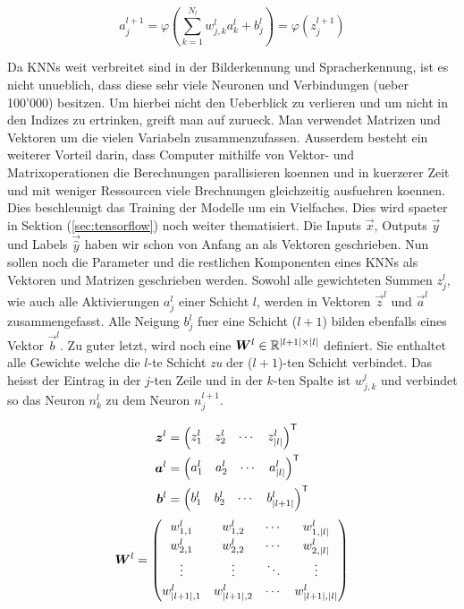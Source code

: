 \begin{equation}\label{eq:aktivierung_normal}
  a_j^{l+1} = \varphi\left(\sum_{k=1}^{N_l} w_{j,k}^l a_k^{l} + b_j^l \right) = \varphi \left( z_j^{l+1} \right)
\end{equation}
\par\bigskip
Da KNNs weit verbreitet sind in der Bilderkennung und Spracherkennung, ist es
nicht unueblich, dass diese sehr viele Neuronen und Verbindungen (ueber 100'000) besitzen.
Um hierbei nicht den Ueberblick zu verlieren und um nicht in den Indizes zu
ertrinken, greift man auf  zurueck. Man verwendet
Matrizen und Vektoren um die vielen Variabeln zusammenzufassen.
Ausserdem besteht ein weiterer Vorteil darin, dass Computer mithilfe von Vektor-
und Matrixoperationen die Berechnungen parallisieren koennen und in kuerzerer
Zeit und mit weniger Ressourcen viele Brechnungen gleichzeitig ausfuehren koennen.
Dies beschleunigt das Training der Modelle um
ein Vielfaches. Dies wird spaeter in Sektion
(\ref{sec:tensorflow}) noch weiter thematisiert.
\para{}
Die Inputs $\vec{x}$, Outputs $\vec{y}$ und Labels $\vec{\hat{y}}$ haben wir schon von Anfang an als Vektoren geschrieben.
Nun sollen noch die Parameter und die restlichen Komponenten eines KNNs als Vektoren und Matrizen geschrieben werden.
Sowohl alle gewichteten Summen $z_j^l$, wie auch alle Aktivierungen $a_j^l$
einer Schicht $l$, werden in Vektoren $\vec{z}^l$ und $\vec{a}^l$ zusammengefasst.
Alle Neigung $b_j^l$ fuer eine Schicht ($l+1$) bilden ebenfalls eines Vektor $\vec{b}^l$.
Zu guter letzt, wird noch eine  $\bm{W}^l \in
\mathbb{R}^{|l+1| \times |l|}$
definiert. Sie enthaltet alle Gewichte welche die $l$-te
Schicht \textit{zu} der ($l+1$)-ten Schicht verbindet.
Das heisst der Eintrag in der $j$-ten Zeile und in
der $k$-ten Spalte ist $w_{j,k}^l$ und verbindet so das Neuron $n_k^{l}$ zu
dem Neuron $n_j^{l+1}$.
\para{}

\begin{align*}
  \bm{z}^l &=  \begin{pmatrix} z_1^l & z_2^l & \cdots & z_{|l|}^l \end{pmatrix}^{\mathsf{T}} \\
  \bm{a}^l &=  \begin{pmatrix} a_1^l & a_2^l & \cdots & a_{|l|}^l \end{pmatrix}^{\mathsf{T}} \\
  \bm{b}^l &=  \begin{pmatrix} b_1^l & b_2^l & \cdots & b_{|l+1|}^l \end{pmatrix}^{\mathsf{T}} \\
\end{align*}
\begin{equation*}
  \bm{W}^l =
  \begin{pmatrix}
    w_{1,1}^l & w_{1,2}^l & \cdots & w_{1,|l|}^l \\[0.3em]
    w_{2,1}^l & w_{2,2}^l & \cdots & w_{2,|l|}^l \\[0.3em]
    \vdots & \vdots & \ddots & \vdots \\[0.3em]
    w_{|l+1|,1}^l & w_{|l+1|,2}^l & \cdots & w_{|l+1|,|l|}^l
  \end{pmatrix}
\end{equation*}

